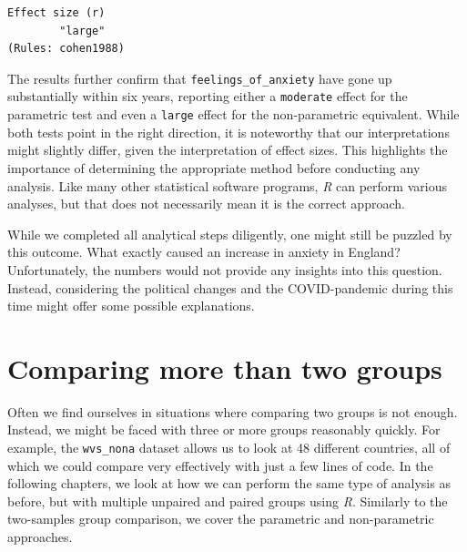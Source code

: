 \documentclass[
  letterpaper,
]{krantz}
\makeatletter
\newenvironment{Shaded}{\begin{snugshade}}{\end{snugshade}}
\newcommand{\AttributeTok}[1]{\textcolor[rgb]{0.40,0.45,0.13}{#1}}
\newcommand{\FunctionTok}[1]{\textcolor[rgb]{0.28,0.35,0.67}{#1}}
\newcommand{\NormalTok}[1]{\textcolor[rgb]{0.00,0.23,0.31}{#1}}
\newcommand{\SpecialCharTok}[1]{\textcolor[rgb]{0.37,0.37,0.37}{#1}}
\newcommand{\StringTok}[1]{\textcolor[rgb]{0.13,0.47,0.30}{#1}}
\newenvironment{kframe}{%
\medskip{}
\setlength{\fboxsep}{.8em}
 \def\at@end@of@kframe{}%
 \ifinner\ifhmode%
  \def\at@end@of@kframe{\end{minipage}}%
  \begin{minipage}{\columnwidth}%
 \fi\fi%
 \def\FrameCommand##1{\hskip\@totalleftmargin \hskip-\fboxsep
 \colorbox{shadecolor}{##1}\hskip-\fboxsep
     \hskip-\linewidth \hskip-\@totalleftmargin \hskip\columnwidth}%
 \MakeFramed {\advance\hsize-\width
   \@totalleftmargin\z@ \linewidth\hsize
   \@setminipage}}%
 {\par\unskip\endMakeFramed%
 \at@end@of@kframe}
\renewenvironment{Shaded}{\begin{kframe}}{\end{kframe}}
\makeatother
\begin{document}
\begin{Shaded}
\end{Shaded}

\begin{verbatim}
Effect size (r) 
        "large" 
(Rules: cohen1988)
\end{verbatim}

The results further confirm that \texttt{feelings\_of\_anxiety} have
gone up substantially within six years, reporting either a
\texttt{moderate} effect for the parametric test and even a
\texttt{large} effect for the non-parametric equivalent. While both
tests point in the right direction, it is noteworthy that our
interpretations might slightly differ, given the interpretation of
effect sizes. This highlights the importance of determining the
appropriate method before conducting any analysis. Like many other
statistical software programs, \emph{R} can perform various analyses,
but that does not necessarily mean it is the correct approach.

While we completed all analytical steps diligently, one might still be
puzzled by this outcome. What exactly caused an increase in anxiety in
England? Unfortunately, the numbers would not provide any insights into
this question. Instead, considering the political changes and the
COVID-pandemic during this time might offer some possible explanations.

\section{Comparing more than two
groups}\label{sec-comparing-more-than-two-groups}

Often we find ourselves in situations where comparing two groups is not
enough. Instead, we might be faced with three or more groups reasonably
quickly. For example, the \texttt{wvs\_nona} dataset allows us to look
at 48 different countries, all of which we could compare very
effectively with just a few lines of code. In the following chapters, we
look at how we can perform the same type of analysis as before, but with
multiple unpaired and paired groups using \emph{R}. Similarly to the
two-samples group comparison, we cover the parametric and non-parametric
approaches.
\end{document}
